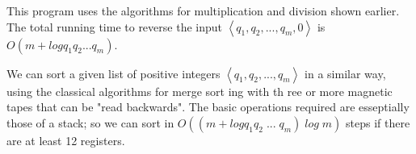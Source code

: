 \documentclass{article}
\begin{document}
\begin{multicols}{3}
\vspace{.5cm}
This program uses the algorithms for multiplication and division shown earlier. The total running time to reverse the input $\left \langle q_{1},q_{2},...,q_{m},0 \right \rangle$
 is $O(m+log q_{1}q_{2}...q_{m})$.
 
\vspace{.5cm}We can sort a given list of positive integers $\left \langle q_{1},q_{2},...,q_{m} \right \rangle$  in  a similar way, using the  classical algorithms for merge sort ing with  th ree or more magnetic tapes that can be "read backwards". The  basic operations  required  are  esseptially  those of a  stack; so we can  sort  in $O((m+log q_{1}q_{2}\;...\;q_{m})\;log\; m)$  steps if  there  are  at  least 12 registers.\\

%
\small



\end{multicols}
\end{document}
